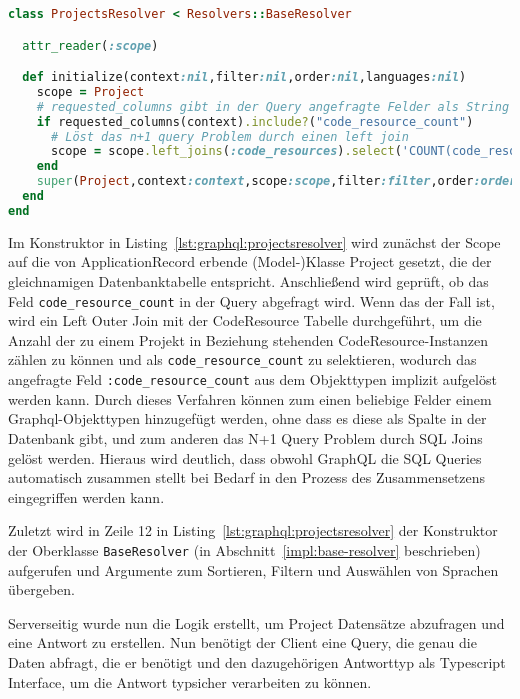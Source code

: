 \begin{lstlisting}[language=Ruby,float=h!,caption={Klasse zum Auflösung der Query \lstinline|:projects|. \lstinline|/graphql/resolvers/projects_resolver.rb|}, label={lst:graphql:projectsresolver}]
class ProjectsResolver < Resolvers::BaseResolver

  attr_reader(:scope)

  def initialize(context:nil,filter:nil,order:nil,languages:nil)
    scope = Project
    # requested_columns gibt in der Query angefragte Felder als String Array zurück
    if requested_columns(context).include?("code_resource_count")
      # Löst das n+1 query Problem durch einen left join
      scope = scope.left_joins(:code_resources).select('COUNT(code_resources) AS code_resource_count').group('projects.id')
    end
    super(Project,context:context,scope:scope,filter:filter,order:order,languages:languages,order_dir: "asc",order_field:"name")
  end
end
\end{lstlisting}

Im Konstruktor in Listing~\ref{lst:graphql:projectsresolver} wird zunächst der Scope auf die von ApplicationRecord erbende (Model-)Klasse Project gesetzt, die der gleichnamigen Datenbanktabelle entspricht. Anschließend wird geprüft, ob das Feld \texttt{code\_resource\-\_count} in der Query abgefragt wird. Wenn das der Fall ist, wird ein Left Outer Join mit der CodeResource Tabelle durchgeführt, um die Anzahl der zu einem Projekt in Beziehung stehenden CodeResource-Instanzen zählen zu können und als \texttt{code\_resource\-\_count} zu selektieren, wodurch das angefragte Feld \texttt{:code\_resource\-\_count} aus dem Objekttypen  implizit aufgelöst werden kann. Durch dieses Verfahren können zum einen beliebige Felder einem Graphql-Objekttypen hinzugefügt werden, ohne dass es diese als Spalte in der Datenbank gibt, und zum anderen das N+1 Query Problem durch SQL Joins gelöst werden. 
Hieraus wird deutlich, dass obwohl GraphQL die SQL Queries automatisch zusammen stellt bei Bedarf in den Prozess des Zusammensetzens eingegriffen werden kann.

Zuletzt wird in Zeile 12 in Listing~\ref{lst:graphql:projectsresolver} der Konstruktor der Oberklasse \texttt{BaseResolver} (in Abschnitt~\ref{impl:base-resolver} beschrieben) aufgerufen und  Argumente zum Sortieren, Filtern und Auswählen von Sprachen übergeben.

Serverseitig wurde nun die Logik erstellt, um Project Datensätze abzufragen und eine Antwort zu erstellen.
Nun benötigt der Client eine Query, die genau die Daten abfragt, die er benötigt und den dazugehörigen Antworttyp als Typescript Interface, um die Antwort typsicher verarbeiten zu können.

